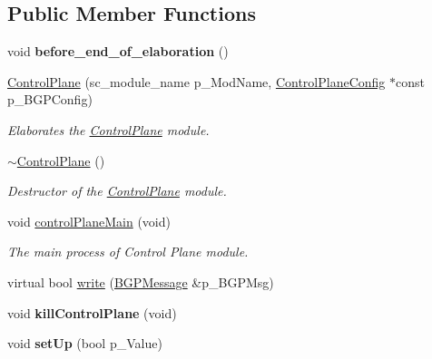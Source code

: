 \subsection*{Public Member Functions}
\begin{DoxyCompactItemize}
\item 
\hypertarget{classControlPlane_a5f1b4e4cd901efc31af6d97b325b2a50}{void {\bfseries before\-\_\-end\-\_\-of\-\_\-elaboration} ()}\label{classControlPlane_a5f1b4e4cd901efc31af6d97b325b2a50}

\item 
\hypertarget{classControlPlane_a03b8627e5a45efd3c5b1cdcdfc36257d}{\hyperlink{classControlPlane_a03b8627e5a45efd3c5b1cdcdfc36257d}{Control\-Plane} (sc\-\_\-module\-\_\-name p\-\_\-\-Mod\-Name, \hyperlink{classControlPlaneConfig}{Control\-Plane\-Config} $\ast$const p\-\_\-\-B\-G\-P\-Config)}\label{classControlPlane_a03b8627e5a45efd3c5b1cdcdfc36257d}

\begin{DoxyCompactList}\small\item\em Elaborates the \hyperlink{classControlPlane}{Control\-Plane} module. \end{DoxyCompactList}\item 
\hyperlink{classControlPlane_a89e252e0ec65d15f1b9cc3a1248c6875}{$\sim$\-Control\-Plane} ()
\begin{DoxyCompactList}\small\item\em Destructor of the \hyperlink{classControlPlane}{Control\-Plane} module. \end{DoxyCompactList}\item 
void \hyperlink{classControlPlane_af1439606467be6968d9b8bc74e797c9b}{control\-Plane\-Main} (void)
\begin{DoxyCompactList}\small\item\em The main process of Control Plane module. \end{DoxyCompactList}\item 
virtual bool \hyperlink{classControlPlane_a602bc55e4d99aab6e0b38468afecdc1f}{write} (\hyperlink{classBGPMessage}{B\-G\-P\-Message} \&p\-\_\-\-B\-G\-P\-Msg)
\item 
\hypertarget{classControlPlane_a75d7a33d6f0ce90d016fc5834e946d89}{void {\bfseries kill\-Control\-Plane} (void)}\label{classControlPlane_a75d7a33d6f0ce90d016fc5834e946d89}

\item 
\hypertarget{classControlPlane_ab1d2f0ce243546442eedf76053811154}{void {\bfseries set\-Up} (bool p\-\_\-\-Value)}\label{classControlPlane_ab1d2f0ce243546442eedf76053811154}


\end{DoxyCompactItemize}
